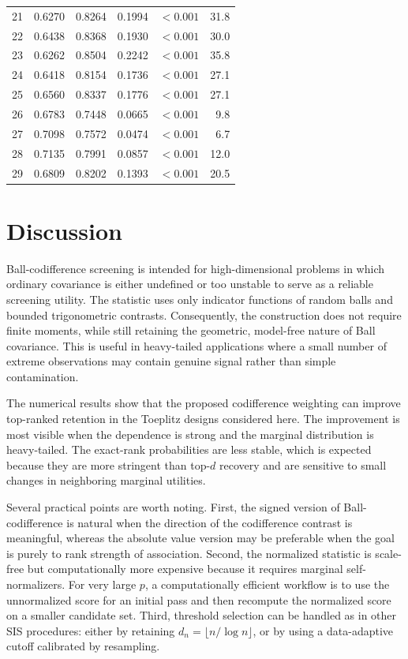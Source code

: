 \documentclass[11pt]{article}
\theoremstyle{definition}
\begin{document}
\begin{table}[!t]
\begin{tabular}{rrrrrr}
21 & 0.6270 & 0.8264 &  0.1994 & $<0.001$ & 31.8 \\
22 & 0.6438 & 0.8368 &  0.1930 & $<0.001$ & 30.0 \\
23 & 0.6262 & 0.8504 &  0.2242 & $<0.001$ & 35.8 \\
24 & 0.6418 & 0.8154 &  0.1736 & $<0.001$ & 27.1 \\
25 & 0.6560 & 0.8337 &  0.1776 & $<0.001$ & 27.1 \\
26 & 0.6783 & 0.7448 &  0.0665 & $<0.001$ &  9.8 \\
27 & 0.7098 & 0.7572 &  0.0474 & $<0.001$ &  6.7 \\
28 & 0.7135 & 0.7991 &  0.0857 & $<0.001$ & 12.0 \\
29 & 0.6809 & 0.8202 &  0.1393 & $<0.001$ & 20.5 \\
\bottomrule
\end{tabular}
\label{tab:rmse_comparison}
\end{table}

\section{Discussion}\label{sec:discussion}

Ball-codifference screening is intended for high-dimensional problems in which ordinary covariance is either undefined or too unstable to serve as a reliable screening utility.  The statistic uses only indicator functions of random balls and bounded trigonometric contrasts.  Consequently, the construction does not require finite moments, while still retaining the geometric, model-free nature of Ball covariance.  This is useful in heavy-tailed applications where a small number of extreme observations may contain genuine signal rather than simple contamination.

The numerical results show that the proposed codifference weighting can improve top-ranked retention in the Toeplitz designs considered here.  The improvement is most visible when the dependence is strong and the marginal distribution is heavy-tailed.  The exact-rank probabilities are less stable, which is expected because they are more stringent than top-\(d\) recovery and are sensitive to small changes in neighboring marginal utilities.

Several practical points are worth noting.  First, the signed version of Ball-codifference is natural when the direction of the codifference contrast is meaningful, whereas the absolute value version may be preferable when the goal is purely to rank strength of association.  Second, the normalized statistic is scale-free but computationally more expensive because it requires marginal self-normalizers.  For very large \(p\), a computationally efficient workflow is to use the unnormalized score for an initial pass and then recompute the normalized score on a smaller candidate set.  Third, threshold selection can be handled as in other SIS procedures: either by retaining \(d_n=\lfloor n/\log n\rfloor\), or by using a data-adaptive cutoff calibrated by resampling.
\end{document}
